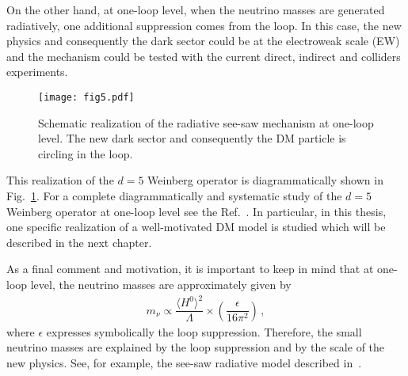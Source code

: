 On the other hand, at one-loop level, when the neutrino masses are generated radiatively, 
one additional suppression comes from the loop.
In this case, the new physics and consequently the dark sector could be at the electroweak scale (EW) and the mechanism could be tested with the current direct, indirect and colliders experiments.
%
\begin{figure}[h]
\begin{center}
\texttt{[image: fig5.pdf]}
\end{center}
\caption{Schematic realization of the radiative see-saw mechanism at one-loop level. The new dark sector and consequently the DM particle is circling in the loop.}
\label{fig:see-saw-one-loop}
\end{figure} 
%
This realization of the $d=5$ Weinberg operator is diagrammatically shown in Fig.~\ref{fig:see-saw-one-loop}. 
For a complete diagrammatically and systematic study of the $d=5$ Weinberg operator at one-loop level see the Ref.~\cite{Bonnet:2012kz}.  
In particular, in this thesis, one specific realization of a well-motivated DM model is studied which will be described in the next chapter.

As a final comment and motivation, it is important to keep in mind that at one-loop level, the neutrino masses are approximately given by 
%
\begin{align}
m_{\nu}\propto 
\dfrac{\langle H^0\rangle ^2 }{\Lambda} \times \left(\dfrac{\epsilon}{16\pi^2}\right) \,,
\end{align}
%
where $\epsilon$ expresses symbolically the loop suppression. 
Therefore, the small neutrino masses are explained by the loop suppression and by the scale of the new physics.  See, for example, the see-saw radiative model described in~\cite{Ma:2006km}.


